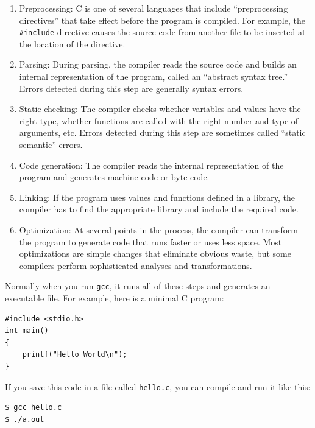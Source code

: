 \documentclass[12pt]{book}
\begin{document}
\begin{enumerate}

\item Preprocessing: C is one of several languages that include
  ``preprocessing directives'' that take effect before the program is
  compiled.  For example, the \verb"#include" directive causes the
  source code from another file to be inserted at the location of the
  directive.

\item Parsing: During parsing, the compiler reads the source code and
  builds an internal representation of the program, called an
  ``abstract syntax tree.''  Errors
  detected during this step are generally syntax errors.

\item Static checking: The compiler checks whether variables and
  values have the right type, whether functions are called with the
  right number and type of arguments, etc.  Errors detected during
  this step are sometimes called ``static semantic'' errors.

\item Code generation: The compiler reads the internal representation
  of the program and generates machine code or byte code.

\item Linking: If the program uses values and functions defined in a
  library, the compiler has to find the appropriate library and
  include the required code.

\item Optimization: At several points in the process, the compiler
  can transform the program to generate code that runs faster or
  uses less space.  Most optimizations are simple changes that eliminate
  obvious waste, but some compilers perform sophisticated analyses and
  transformations.

\end{enumerate}

Normally when you run {\tt gcc}, it runs all of these steps and
generates an executable file.  For example, here is a minimal C
program:

\begin{verbatim}
#include <stdio.h>
int main()
{
    printf("Hello World\n");
}
\end{verbatim}

If you save this code in a file called
{\tt hello.c}, you can compile and run it like this:

\begin{verbatim}
$ gcc hello.c
$ ./a.out
\end{verbatim}
\end{document}
